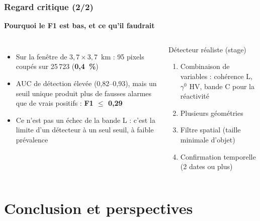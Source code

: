 \documentclass[aspectratio=169]{beamer}
\newcommand{\slidesubtitle}[1]{%
	\textcolor{myblue}{\small\textbf{#1}}%
	\par\vspace{3pt}%
}
\begin{document}
\begin{frame}{\phantom{x}}
	\frametitle{Regard critique (2/2)}
	\slidesubtitle{Pourquoi le F1 est bas, et ce qu'il faudrait}
	\small
	\begin{columns}[T]
		\begin{itemize}
			\setlength{\itemsep}{5pt}
			\item Sur la fenêtre de $3{,}7\times3{,}7$~km : 95 pixels coupés sur 25\,723 (\textbf{0,4~\%})
			\item AUC de détection élevée (0,82--0,93), mais un seuil unique \parencite{otsu1979threshold} produit
			plus de fausses alarmes que de vrais positifs : \textbf{F1 $\leq$ 0,29}
			\item Ce n'est pas un échec de la bande L : c'est la limite d'un détecteur à un seul seuil, à faible
			prévalence
		\end{itemize}

		\begin{block}{Détecteur réaliste (stage)}
			\footnotesize
			\begin{enumerate}
				\setlength{\itemsep}{3pt}
				\item Combinaison de variables : cohérence L, $\gamma^0$ HV, bande C pour la réactivité
				\item Plusieurs géométries
				\item Filtre spatial (taille minimale d'objet)
				\item Confirmation temporelle (2 dates ou plus)
			\end{enumerate}
		\end{block}
	\end{columns}
\end{frame}

\section{Conclusion et perspectives}
\end{document}
